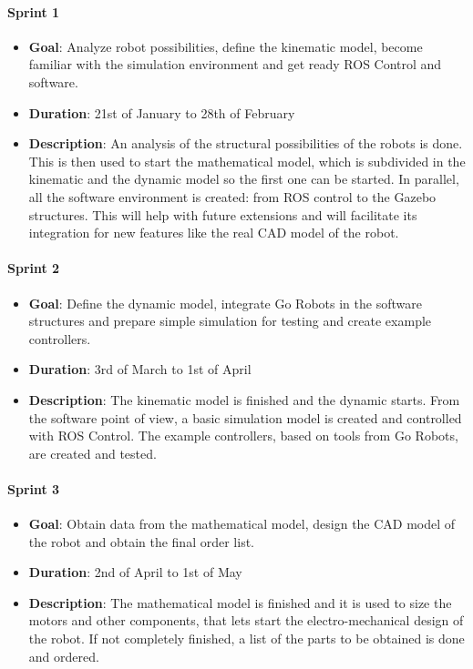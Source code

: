 \paragraph{\textbf{Sprint 1}}
\begin{itemize}
  \item \textbf{Goal}: Analyze robot possibilities, define the kinematic model, become familiar with the simulation environment and get ready ROS Control and software.
  \item \textbf{Duration}: 21st of January to 28th of February
  \item \textbf{Description}: An analysis of the structural possibilities of the robots is done. This is then used to start the mathematical model, which is subdivided in the kinematic and the dynamic model so the first one can be started. In parallel, all the software environment is created: from ROS control to the Gazebo structures. This will help with future extensions and will facilitate its integration for new features like the real CAD model of the robot.
\end{itemize}
\paragraph{\textbf{Sprint 2}}
  \begin{itemize}
    \item \textbf{Goal}: Define the dynamic model, integrate Go Robots in the software structures and prepare simple simulation for testing and create example controllers.
    \item \textbf{Duration}: 3rd of March to 1st of April
    \item \textbf{Description}: The kinematic model is finished and the dynamic starts. From the software point of view, a basic simulation model is created and controlled with ROS Control. The example controllers, based on tools from Go Robots, are created and tested.
  \end{itemize}
\paragraph{\textbf{Sprint 3}}
  \begin{itemize}
    \item \textbf{Goal}: Obtain data from the mathematical model, design the CAD model of the robot and obtain the final order list.
    \item \textbf{Duration}: 2nd of April to 1st of May
    \item \textbf{Description}: The mathematical model is finished and it is used to size the motors and other components, that lets start the electro-mechanical design of the robot. If not completely finished, a list of the parts to be obtained is done and ordered.
  \end{itemize}

